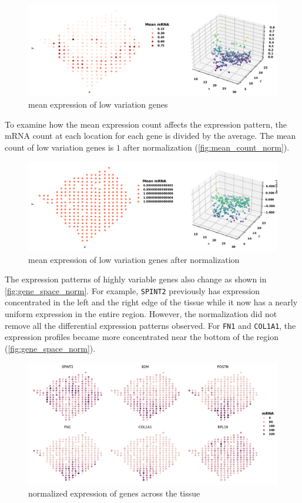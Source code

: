 \documentclass[11pt,oneside]{article}
\begin{document}
\begin{figure}[ht]
\centering
\includegraphics[width=.9\textwidth]{2mean_count.pdf}
\caption{mean expression of low variation genes}
\label{fig:mean_count}
\end{figure}

To examine how the mean expression count affects the expression pattern, the mRNA count at each location for each gene is divided by the average. The mean count of low variation genes is $1$ after normalization (\autoref{fig:mean_count_norm}).

\begin{figure}[ht]
\centering
\includegraphics[width=.9\textwidth]{2mean_count_norm.pdf}
\caption{mean expression of low variation genes after normalization}
\label{fig:mean_count_norm}
\end{figure}

The expression patterns of highly variable genes also change as shown in \autoref{fig:gene_space_norm}. For example, \texttt{SPINT2} previously has expression concentrated in the left and the right edge of the tissue while it now has a nearly uniform expression in the entire region. However, the normalization did not remove all the differential expression patterns observed. For \texttt{FN1} and \texttt{COL1A1}, the expression profiles became more concentrated near the bottom of the region (\autoref{fig:gene_space_norm}).

\begin{figure}[ht]
\centering
\includegraphics[width=.9\textwidth]{2gene_space_norm.pdf}
\caption{normalized expression of genes across the tissue}
\label{fig:gene_space_norm}
\end{figure}
\end{document}

